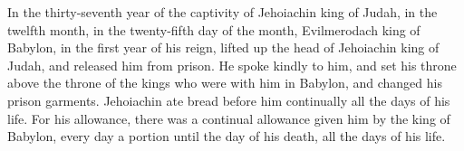  In the thirty-seventh year of the captivity of
Jehoiachin king of Judah, in the twelfth month, in the twenty-fifth day
of the month, Evilmerodach king of Babylon, in the first year of his
reign, lifted up the head of Jehoiachin king of Judah, and released him
from prison.  He spoke kindly to him, and set his throne
above the throne of the kings who were with him in Babylon,
 and changed his prison garments. Jehoiachin ate bread
before him continually all the days of his life.  For his
allowance, there was a continual allowance given him by the king of
Babylon, every day a portion until the day of his death, all the days of
his life.
